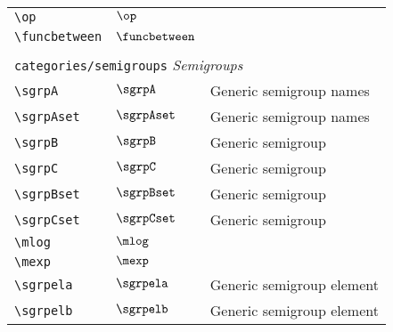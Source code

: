 \begin{longtable}{lll}
  {\color[rgb]{0.5,0.5,0.5}\texttt{\textbackslash op}}                                                      & $\op$                      & \\
  {\color[rgb]{0.5,0.5,0.5}\texttt{\textbackslash funcbetween}}                                             & $\funcbetween$             &                                                         \\
  &                            &                                                         \\
  \multicolumn{3}{l}{{\color[rgb]{0.5,0.5,0.5}\texttt{categories/semigroups}} \emph{Semigroups}}
  \\
  \hline
  {\color[rgb]{0.5,0.5,0.5}\texttt{\textbackslash sgrpA}}                                                   & $\sgrpA$                   & Generic semigroup names\\
  {\color[rgb]{0.5,0.5,0.5}\texttt{\textbackslash sgrpAset}}                                                & $\sgrpAset$                & Generic semigroup names\\
  {\color[rgb]{0.5,0.5,0.5}\texttt{\textbackslash sgrpB}}                                                   & $\sgrpB$                   & Generic semigroup\\
  {\color[rgb]{0.5,0.5,0.5}\texttt{\textbackslash sgrpC}}                                                   & $\sgrpC$                   & Generic semigroup\\
  {\color[rgb]{0.5,0.5,0.5}\texttt{\textbackslash sgrpBset}}                                                & $\sgrpBset$                & Generic semigroup\\
  {\color[rgb]{0.5,0.5,0.5}\texttt{\textbackslash sgrpCset}}                                                & $\sgrpCset$                & Generic semigroup\\
  {\color[rgb]{0.5,0.5,0.5}\texttt{\textbackslash mlog}}                                                    & $\mlog$                    & \\
  {\color[rgb]{0.5,0.5,0.5}\texttt{\textbackslash mexp}}                                                    & $\mexp$                    & \\
  {\color[rgb]{0.5,0.5,0.5}\texttt{\textbackslash sgrpela}}                                                 & $\sgrpela$                 & Generic semigroup element\\
  {\color[rgb]{0.5,0.5,0.5}\texttt{\textbackslash sgrpelb}}                                                 & $\sgrpelb$                 & Generic semigroup element\\

\end{longtable}
